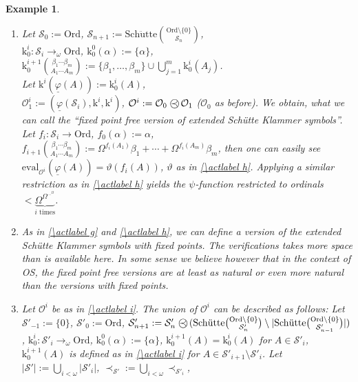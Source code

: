 \documentclass[10pt]{article}
\def \ssubitem#1{\item \label{\actlabel#1} }
\def \refsub#1#2{\ref{#1#2}}                    %
\def \refact#1{\ref{\actlabel#1}}               %
\newtheorem {example}[lemma]{Example}
\def\ar{\rightarrow}
\def \calO{{\mathcal O}}
\def \calS{{\mathcal S}}
\def\k{\mathrm{k}}
\def\eval{\mathrm{eval}}
\def\phibar{{\underline{\varphi}}}
\def\schuette{\mathrm{Sch\ddot{u}tte}}
\def\preccirc{\mathrel{\bigcirc \kern-12pt \prec}} %
\def\Ord{\mathrm{Ord}}
\begin{document}
\begin{example}
{\begin{enumerate}
OS for terms of the form $\phibar(a)$.
\ssubitem i Let $\calS_0:= \Ord$,
$\calS_{n+1}:= \schuette{\Ord \setminus \{ 0 \}  \choose \calS_n}$,\\
$\k^i_0: \calS_i \ar_\omega \Ord$,
$\k^0_0(\alpha):= \{ \alpha \}$,
$\k^{i+1}_0 
{\beta_1 \cdots \beta_m \choose A_1 \cdots A_m}:=
\{ \beta_1 ,\ldots, \beta_m \} \cup \bigcup_{j=1}^m \k^i_0(A_j)$.\\
Let $\k^i(\phibar(A)):= \k^i_0(A)$,\\
$\calO^i_1:= (\phibar(\calS_i),\k^i,\k^i)$,
$\calO^i:=\calO_0 \preccirc \calO_1$ ($\calO_0$ as before).
We obtain, what we can call the ``fixed point free version of
extended Sch{\"u}tte Klammer symbols''. Let
$f_i: \calS_i \ar \Ord$,
$f_0(\alpha):= \alpha$,
$f_{i+1} 
{\beta_1 \cdots \beta_m \choose A_1 \cdots A_m}:=
\Omega^{f_i(A_1)}\beta_1 +\cdots+ \Omega^{f_i(A_m)} \beta_m$,
then one can easily see
$\eval_{\calO^i}(\phibar(A))= 
\vartheta(f_i(A))$, $\vartheta$ as in \refact h.
Applying a similar restriction as in \refact h yields
the $\psi$-function restricted to 
ordinals $<\underbrace{\Omega^{\Omega^{\cdots^{\Omega}}}}_{i
\text{ times}}$.\par 
\ssubitem j As in \refact g and \refact h, we can define a 
version of the extended Sch{\"u}tte Klammer symbols with fixed points.
The verifications takes more space than is available here.
In some sense we believe however that in the context of 
OS, the fixed point free versions are at least as natural or 
even more natural than the versions with fixed points.
\ssubitem k Let $\calO^i$ be as in \refact i. 
The union of $\calO^i$ can be described as follows:
Let $\calS'_{-1}:= \{ 0 \}$, $\calS'_0:= \Ord$,
$\calS'_{n+1} := 
\calS'_n \preccirc 
(\schuette{\Ord \setminus \{ 0 \} \choose \calS'_n} \setminus 
|\schuette{\Ord \setminus \{ 0 \} \choose \calS'_{n-1}}|)$,
$\k^i_0: \calS'_i \ar_\omega \Ord$,
$\k^0_0(\alpha):= \{ \alpha \} $,
$\k^{i+1}_0(A)= \k^i_0(A)$ for $A \in \calS'_i$,
$\k^{i+1}_0(A)$ is defined as in 
\refact i for $A \in \calS'_{i+1} \setminus 
\calS'_i$.
Let $|\calS'|:= \bigcup_{i< \omega }|\calS'_i|$,
$\prec_{\calS'} := \bigcup_{i<\omega}\prec_{\calS'_i}$,

\end{enumerate}}
\end{example}
\end{document}
